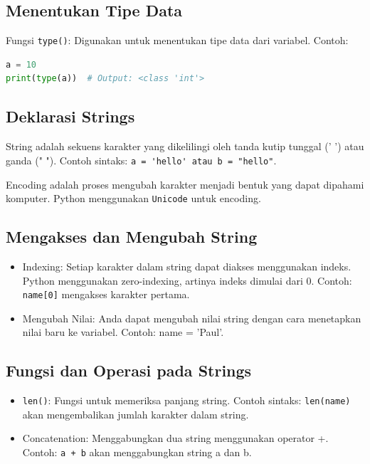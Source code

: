 \documentclass{article}
\begin{document}
\subsection{Menentukan Tipe Data}
Fungsi \verb|type()|: Digunakan untuk menentukan tipe data dari variabel. Contoh:
\begin{lstlisting}[language=Python, caption={}, captionpos=b]
a = 10
print(type(a))  # Output: <class 'int'>
\end{lstlisting}

\subsection{Deklarasi Strings}
String adalah sekuens karakter yang dikelilingi oleh tanda kutip tunggal (' ') atau ganda (" "). Contoh sintaks: \verb|a = 'hello' atau b = "hello"|.

Encoding adalah proses mengubah karakter menjadi bentuk yang dapat dipahami komputer. Python menggunakan \verb|Unicode| untuk encoding.

\subsection{Mengakses dan Mengubah String}
\begin{itemize}
    \item Indexing: Setiap karakter dalam string dapat diakses menggunakan indeks. Python menggunakan zero-indexing, artinya indeks dimulai dari 0. Contoh: \verb|name[0]| mengakses karakter pertama.
    \item Mengubah Nilai: Anda dapat mengubah nilai string dengan cara menetapkan nilai baru ke variabel. Contoh: name = 'Paul'.
\end{itemize}

\subsection{Fungsi dan Operasi pada Strings}
\begin{itemize}
    \item \verb|len()|: Fungsi untuk memeriksa panjang string. Contoh sintaks: \verb|len(name)| akan mengembalikan jumlah karakter dalam string.
    \item Concatenation: Menggabungkan dua string menggunakan operator +. Contoh: \verb|a + b| akan menggabungkan string a dan b.
\end{itemize}
\end{document}
